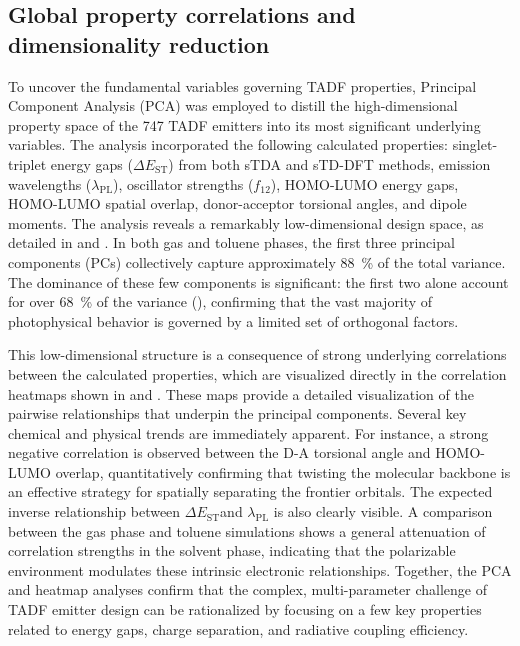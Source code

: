 \documentclass[journal=jcisd8,manuscript=article,keywords=true]{achemso}
\newcommand{\deltaest}{$\Delta E_{\text{ST}}$}
\begin{document}
\subsection{Global property correlations and dimensionality reduction}

To uncover the fundamental variables governing TADF properties, Principal Component
Analysis (PCA) was employed to distill the high-dimensional property space of the
\num{747} TADF emitters into its most significant underlying variables. The analysis
incorporated the following calculated properties: singlet-triplet energy gaps
($\Delta E_{\text{ST}}$) from both sTDA and sTD-DFT methods, emission wavelengths
($\lambda_{\text{PL}}$), oscillator strengths ($f_{12}$), HOMO-LUMO energy gaps,
HOMO-LUMO spatial overlap, donor-acceptor torsional angles, and dipole moments. The analysis
reveals a remarkably low-dimensional design space, as detailed in
 and . In both gas and toluene phases, the first three principal
components (PCs) collectively capture approximately \qty{88}{\percent} of the total
variance. The dominance of these few components is significant: the first two alone
account for over \qty{68}{\percent} of the variance (), confirming
that the vast majority of photophysical behavior is governed by a limited set of
orthogonal factors.

This low-dimensional structure is a consequence of strong underlying correlations between
the calculated properties, which are visualized directly in the correlation heatmaps shown
in  and . These maps provide a detailed visualization of
the pairwise relationships that underpin the principal components. Several key chemical
and physical trends are immediately apparent. For instance, a strong negative correlation
is observed between the D-A torsional angle and HOMO-LUMO overlap, quantitatively
confirming that twisting the molecular backbone is an effective strategy for spatially
separating the frontier orbitals. The expected inverse relationship between \deltaest and
$\lambda_{\text{PL}}$ is also clearly visible. A comparison between the gas phase
and toluene simulations shows a general attenuation of correlation strengths in the
solvent phase, indicating that the polarizable environment modulates these intrinsic
electronic relationships. Together, the PCA and heatmap analyses confirm that the complex,
multi-parameter challenge of TADF emitter design can be rationalized by focusing on a few
key properties related to energy gaps, charge separation, and radiative coupling
efficiency.
\end{document}
